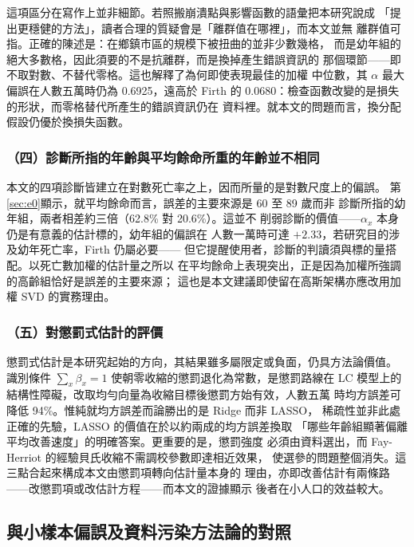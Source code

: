 \documentclass[UTF8, fontset=macnew, a4paper, 12pt]{ctexart}
\newcommand{\cn}[1]{\ding{\number\numexpr171+#1\relax}}
\begin{document}
這項區分在寫作上並非細節。若照搬崩潰點與影響函數的語彙把本研究說成
「提出更穩健的方法」，讀者合理的質疑會是「離群值在哪裡」，而本文並無
離群值可指。正確的陳述是：在鄉鎮市區的規模下被扭曲的並非少數幾格，
而是幼年組的絕大多數格，因此須要的不是抗離群，而是換掉產生錯誤資訊的
那個環節——即不取對數、不替代零格。這也解釋了為何即使表現最佳的加權
中位數，其 $\alpha$ 最大偏誤在人數五萬時仍為 0.6925，遠高於 Firth 的
0.0680：檢查函數改變的是損失的形狀，而零格替代所產生的錯誤資訊仍在
資料裡。就本文的問題而言，換分配假設仍優於換損失函數。

\subsubsection{（四）診斷所指的年齡與平均餘命所重的年齡並不相同}

本文的四項診斷皆建立在對數死亡率之上，因而所量的是對數尺度上的偏誤。
第\ref{sec:e0}顯示，就平均餘命而言，誤差的主要來源是 60 至 89 歲而非
診斷\cn{2}所指的幼年組，兩者相差約三倍（62.8\% 對 20.6\%）。這並不
削弱診斷的價值——$\alpha_x$ 本身仍是有意義的估計標的，幼年組的偏誤在
人數一萬時可達 $+2.33$，若研究目的涉及幼年死亡率，Firth 仍屬必要——
但它提醒使用者，診斷的判讀須與標的量搭配。以死亡數加權的估計量之所以
在平均餘命上表現突出，正是因為加權所強調的高齡組恰好是誤差的主要來源；
這也是本文建議即使留在高斯架構亦應改用加權 SVD 的實務理由。

\subsubsection{（五）對懲罰式估計的評價}

懲罰式估計是本研究起始的方向，其結果雖多屬限定或負面，仍具方法論價值。
識別條件 $\sum_x\beta_x=1$ 使朝零收縮的懲罰退化為常數，是懲罰路線在
LC 模型上的結構性障礙，改取均勻向量為收縮目標後懲罰方始有效，人數五萬
時均方誤差可降低 94\%。惟純就均方誤差而論勝出的是 Ridge 而非 LASSO，
稀疏性並非此處正確的先驗，LASSO 的價值在於以約兩成的均方誤差換取
「哪些年齡組顯著偏離平均改善速度」的明確答案。更重要的是，懲罰強度
必須由資料選出，而 Fay-Herriot 的經驗貝氏收縮不需調校參數即達相近效果，
使選參的問題整個消失。這三點合起來構成本文由懲罰項轉向估計量本身的
理由，亦即改善估計有兩條路——改懲罰項或改估計方程——而本文的證據顯示
後者在小人口的效益較大。

\subsection{與小樣本偏誤及資料污染方法論的對照}\label{sec:theory}
\end{document}

